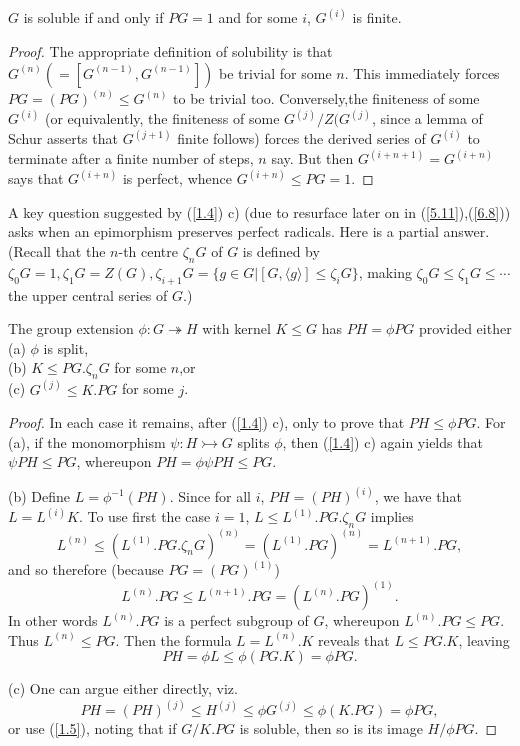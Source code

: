 \begin{prop}\label{1.5}
$G$ is soluble if and only if $PG=1$ and for some $i$, $G^{(i)}$ is finite.
\end{prop}
\begin{proof}
The appropriate definition of solubility is that $G^{(n)}(=[G^{(n-1)},G^{(n-1)}])$ be trivial for some $n$. This immediately forces $PG=(PG)^{(n)}\leqslant G^{(n)}$ to be trivial too. Conversely,the finiteness of some $G^{(i)}$ (or equivalently, the finiteness of some $G^{(j)}/Z(G^{(j)}$, since a lemma of Schur asserts that $G^{(j+1)}$ finite follows) forces the derived series of $G^{(i)}$ to terminate after a finite number of steps, $n$ say. But then $G^{(i+n+1)}=G^{(i+n)}$ says that $G^{(i+n)}$ is perfect, whence
$G^{(i+n)}\leqslant PG=1$.
\end{proof}

A key question suggested by (\ref{1.4}) c) (due to resurface later on in (\ref{5.11}),(\ref{6.8})) asks when an epimorphism preserves perfect radicals. Here is a partial answer. (Recall that the $n$-th centre $\zeta_n G$ of $G$ is defined by $\zeta_0 G=1,\zeta_1G=Z(G),\zeta_{i+1}G=\{g\in G|[G,\langle g\rangle]\leqslant \zeta_iG\}$, making
$\zeta_0 G\leqslant \zeta_1 G\leqslant \cdots$ the upper central series of $G$.)
\begin{prop}
\label{1.6}
The group extension $\phi\colon  G\twoheadrightarrow H$ with kernel $K\leqslant G$ has $PH = \phi PG$ provided either\\
(a) $\phi$ is split,\\
(b) $K\leqslant PG.\zeta_n G$ for some $n$,or\\
(c) $G^{(j)}\leqslant K.PG$ for some $j$.
\end{prop}
\begin{proof}
In each case it remains, after (\ref{1.4}) c), only to prove that $PH \leqslant \phi PG$. For (a), if the monomorphism $\psi\colon  H\rightarrowtail G$ splits $\phi$, then (\ref{1.4}) c) again yields that $\psi PH \leqslant  PG$, whereupon $PH=\phi \psi PH\leqslant PG$.

(b) Define $L=\phi^{-1}(PH)$. Since for all $i$, $PH=(PH)^{(i)}$, we have that $L=L^{(i)}K$. To use first the case $i=1$, $L\leqslant L^{(1)}.PG.\zeta_n G$ implies
\[L^{(n)}\leqslant (L^{(1)}.PG.\zeta_n G)^{(n)}=(L^{(1)}.PG)^{(n)}=L^{(n+1)}.PG,\]
and so therefore (because $PG=(PG)^{(1)}$)
\[L^{(n)}.PG\leqslant L^{(n+1)}.PG=(L^{(n)}.PG)^{(1)}.\]
In other words $L^{(n)}.PG$ is a perfect subgroup of $G$, whereupon $L^{(n)}.PG\leqslant PG$. Thus $L^{(n)}\leqslant PG$. Then the formula $L=L^{(n)}.K$ reveals that $L\leqslant PG.K$, leaving
\[PH=\phi L\leqslant \phi(PG.K)=\phi PG.\]

(c) One can argue either directly, viz.
\[PH=(PH)^{(j)}\leqslant H^{(j)} \leqslant  \phi G^{(j)} \leqslant \phi(K.PG)=\phi PG,\]
or use (\ref{1.5}), noting that if $G/K.PG$ is soluble, then so is its image $H/\phi PG$. 
\end{proof}

